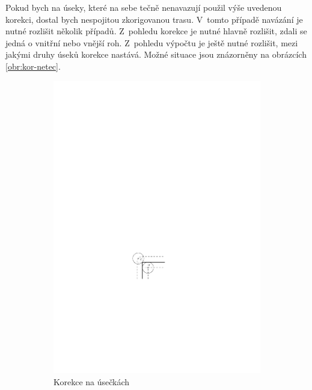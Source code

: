 			Pokud bych na úseky, které na sebe tečně nenavazují použil výše uvedenou korekci, dostal bych nespojitou zkorigovanou trasu. V~tomto případě navázání je nutné rozlišit několik případů. Z~pohledu korekce je nutné hlavně rozlišit, zdali se jedná o vnitřní nebo vnější roh. Z~pohledu výpočtu je ještě nutné rozlišit, mezi jakými druhy úseků korekce nastává. Možné situace jsou znázorněny na obrázcích \ref{obr:kor-netec}.
			
			\begin{figure}[h]
				\centering
					\begin{subfigure}[b]{0.3\textwidth}
						\centering
						\includegraphics[width=\textwidth]{img/korekce-lin-dva.pdf}
						\caption{Korekce na úsečkách}
					\end{subfigure}
					~
					\begin{subfigure}[b]{0.3\textwidth}
						\centering

\end{subfigure}
\end{figure}
